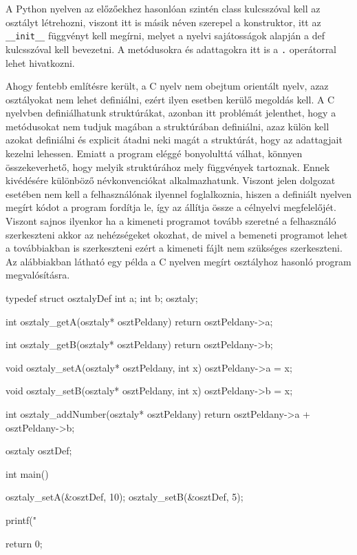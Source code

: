 A Python nyelven az előzőekhez hasonlóan szintén class kulcsszóval kell az osztályt létrehozni, viszont itt is másik néven szerepel a konstruktor, itt az \texttt{\_\_init\_\_} függvényt kell megírni, melyet a nyelvi sajátosságok alapján a def kulcsszóval kell bevezetni. A metódusokra és adattagokra itt is a \texttt{.} operátorral lehet hivatkozni.

Ahogy fentebb említésre került, a C nyelv nem obejtum orientált nyelv, azaz osztályokat nem lehet definiálni, ezért ilyen esetben kerülő megoldás kell. A C nyelvben definiálhatunk struktúrákat, azonban itt problémát jelenthet, hogy a metódusokat nem tudjuk magában a struktúrában definiálni, azaz külön kell azokat definiálni és explicit átadni neki magát a struktúrát, hogy az adattagjait kezelni lehessen. Emiatt a program eléggé bonyolulttá válhat, könnyen összekeverhető, hogy melyik struktúrához mely függvények tartoznak. Ennek kivédésére különböző névkonvenciókat alkalmazhatunk. Viszont jelen dolgozat esetében nem kell a felhasználónak ilyennel foglalkoznia, hiszen a definiált nyelven megírt kódot a program fordítja le, így az állítja össze a célnyelvi megfelelőjét. Viszont sajnos ilyenkor ha a kimeneti programot tovább szeretné a felhasználó szerkeszteni akkor az nehézségeket okozhat, de mivel a bemeneti programot lehet a továbbiakban is szerkeszteni ezért a kimeneti fájlt nem szükséges szerkeszteni.
Az alábbiakban látható egy példa a C nyelven megírt osztályhoz hasonló program megvalósításra.
\begin{cpp}
	typedef struct osztalyDef {
		int a;
		int b;
	} osztaly;
	
	int osztaly_getA(osztaly* osztPeldany) {
		return osztPeldany->a;
	}
	
	int osztaly_getB(osztaly* osztPeldany) {
		return osztPeldany->b;
	}
	
	void osztaly_setA(osztaly* osztPeldany, int x) {
		osztPeldany->a = x;
	}
	
	void osztaly_setB(osztaly* osztPeldany, int x) {
		osztPeldany->b = x;
	}
	
	int osztaly_addNumber(osztaly* osztPeldany) {
		return osztPeldany->a + osztPeldany->b;
	}
	
	osztaly osztDef;
	
	int main()
	{
		osztaly_setA(&osztDef, 10);
		osztaly_setB(&osztDef, 5);
		
		printf("%
		
		return 0;
	}
\end{cpp}

